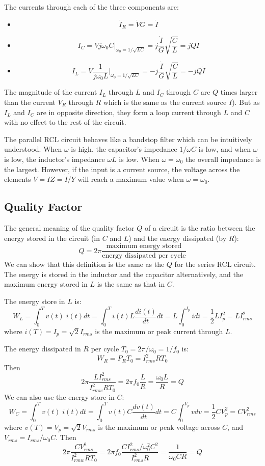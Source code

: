 The currents through each of the three components are:
\begin{itemize}
\item 
\[ \dot{I}_R=\dot{V} G=\dot{I}	\]
\item 
\[ \dot{I}_C=\dot{V} j\omega_0 C|_{\omega_0=1/\sqrt{LC}}
	=j \frac{\dot{I}}{G}\sqrt{\frac{C}{L}}=jQ\dot{I}	\]
\item 
\[ \dot{I}_L=\dot{V}\frac{1}{j\omega_0 L}|_{\omega_0=1/\sqrt{LC}}
	=-j \frac{\dot{I}}{G}\sqrt{\frac{C}{L}}=-jQ\dot{I}	\]
\end{itemize}
The magnitude of the current $I_L$ through $L$ and $I_C$ through $C$ are
$Q$ times larger than the current $\dot{V}_R$ through $R$ which is the 
same as the current source $\dot{I}$). But as $I_L$ and $I_C$ are in
opposite direction, they form a loop current through $L$ and $C$ with
no effect to the rest of the circuit.

The parallel RCL circuit behaves like a bandstop filter which can be 
intuitively understood. When $\omega$ is high, the capacitor's impedance 
$1/\omega C$ is low, and when $\omega$ is low, the inductor's impedance 
$\omega L$ is low. When $\omega=\omega_0$ the overall impedance is the
largest. However, if the input is a current source, the voltage across 
the elements $\dot{V}=\dot{I}Z=\dot{I}/Y$ will reach a maximum value
when $\omega=\omega_0$.


\subsection*{Quality Factor}

The general meaning of the quality factor $Q$ of a circuit is the ratio 
between the energy stored in the circuit (in $C$ and $L$) and the energy 
dissipated (by $R$):
\[
Q=2\pi\frac{\mbox{maximum energy stored}}{\mbox{energy dissipated per cycle}}
\]
We can show that this definition is the same as the $Q$ for the series 
RCL circuit. The energy is stored in the inductor and the capacitor 
alternatively, and the maximum energy stored in $L$ is the same as that 
in $C$. 

The energy store in $L$ is:
\[	W_L=\int_0^T v(t)\; i(t) dt=\int_0^T i(t) L \frac{di(t)}{dt} dt
	=L \int_0^{I_p} i di=\frac{1}{2}LI_p^2=LI^2_{rms}	\]
where $i(T)=I_p=\sqrt{2}I_{rms}$ is the maximum or peak current through
$L$. 

The energy dissipated in $R$ per cycle $T_0=2\pi/\omega_0=1/f_0$ is:
\[	W_R=P_R T_0=I^2_{rms} R T_0	\]
Then
\[ 2\pi\frac{LI^2_{rms}}{I^2_{rmw}RT_0 }
	=2\pi f_0\frac{L}{R}=\frac{\omega_0L}{R}=Q	\]
We can also use the energy store in $C$:
\[	W_C=\int_0^T v(t)\; i(t) dt=\int_0^T v(t) C \frac{dv(t)}{dt} dt
	=C \int_0^{V_p} v dv=\frac{1}{2}CV_p^2=CV^2_{rms}	\]
where $v(T)=V_p=\sqrt{2}V_{rms}$ is the maximum or peak voltage across
$C$, and $V_{rms}=I_{rms}/\omega_0C$. Then
\[ 2\pi\frac{CV^2_{rms}}{I^2_{rmw}RT_0 }
	=2\pi f_0\frac{CI^2_{rms}/\omega_0^2C^2}{I^2_{rms} R}
	=\frac{1}{\omega_0CR}=Q	\]

